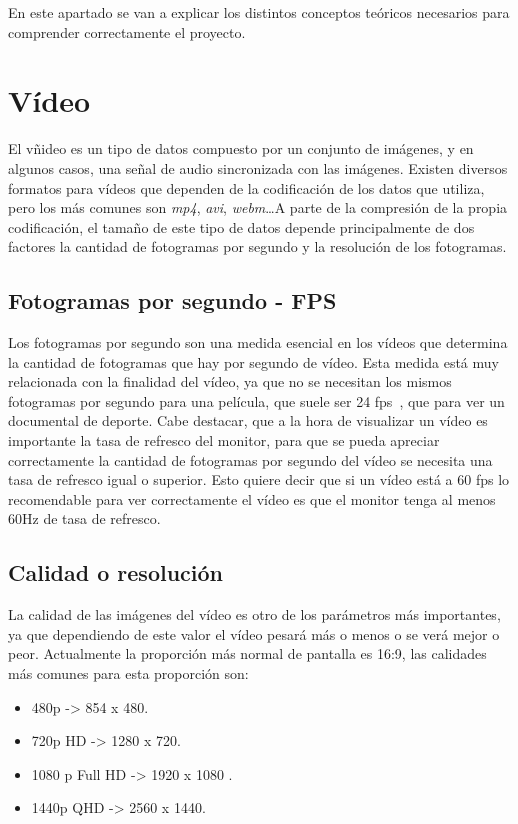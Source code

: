 
En este apartado se van a explicar los distintos conceptos teóricos necesarios para comprender correctamente el proyecto.

\section{Vídeo}
El vñideo es un tipo de datos compuesto por un conjunto de imágenes, y en algunos casos, una señal de audio sincronizada con las imágenes. Existen diversos formatos para vídeos que dependen de la codificación de los datos que utiliza, pero los más comunes son \textit{mp4}, \textit{avi}, \textit{webm}\ldots A parte de la compresión de la propia codificación, el tamaño de este tipo de datos depende principalmente de dos factores la cantidad de fotogramas por segundo y la resolución de los fotogramas.
\subsection{Fotogramas por segundo - FPS}
Los fotogramas por segundo son una medida esencial en los vídeos que determina la cantidad de fotogramas que hay por segundo de vídeo. Esta medida está muy relacionada con la finalidad del vídeo, ya que no se necesitan los mismos fotogramas por segundo para una película, que suele ser 24 fps~\cite{fpscine}, que para ver un documental de deporte. Cabe destacar, que a la hora de visualizar un vídeo es importante la tasa de refresco del monitor, para que se pueda apreciar correctamente la cantidad de fotogramas por segundo del vídeo se necesita una tasa de refresco igual o superior. Esto quiere decir que si un vídeo está a 60 fps lo recomendable para ver correctamente el vídeo es que el monitor tenga al menos 60Hz de tasa de refresco.
\subsection{Calidad o resolución}
La calidad de las imágenes del vídeo es otro de los parámetros más importantes, ya que dependiendo de este valor el vídeo pesará más o menos o se verá mejor o peor. Actualmente la proporción más normal de pantalla es 16:9, las calidades más comunes para esta proporción son:
\begin{itemize}
	\item 480p -> 854 x 480.
	\item 720p HD -> 1280 x 720.
	\item 1080 p Full HD -> 1920 x 1080 .
	\item 1440p QHD -> 2560 x 1440.
\end{itemize}
